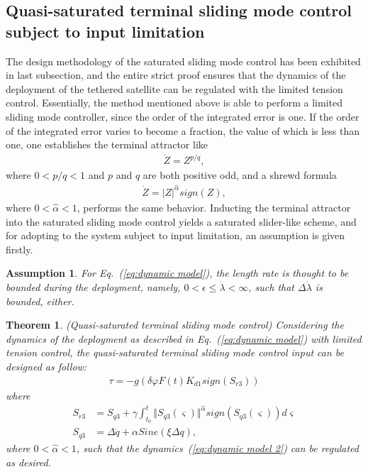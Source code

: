 \documentclass[Journal,letterpaper]{ascelike-new}
\theoremstyle{plain}
\newtheorem{myas}{Assumption}
\newtheorem{mythm}{Theorem}
\theoremstyle{remark}
\begin{document}
\subsection{Quasi-saturated terminal sliding mode control subject to input limitation}
The design methodology of the saturated sliding mode control has been exhibited in last subsection, and the entire strict proof ensures that the dynamics of the deployment of the tethered satellite can be regulated with the limited tension control. Essentially, the method mentioned above is able to perform a limited sliding mode controller, since the order of the integrated error is one. If the order of the integrated error varies to become a fraction, the value of which is less than one, one establishes the terminal attractor like
\begin{align}
\dot Z = Z^{p/q},
\end{align}
where $0<p/q<1$ and $p$ and $q$ are both positive odd, and a shrewd formula
\begin{align}
\dot Z = \vert Z\vert^{\hat\alpha} sign(Z),
\end{align}
where $0<\hat \alpha<1$, performs the same behavior. Inducting the terminal attractor into the saturated sliding mode control yields a saturated slider-like scheme, and for adopting to the system subject to input limitation, an assumption is given firstly.
\begin{myas}\label{as:1}
For Eq.~(\ref{eq:dynamic model}), the length rate is thought to be bounded during the deployment, namely, $0<\epsilon\le\dot \lambda<\infty$, such that $\Delta \dot \lambda$ is bounded, either.
\end{myas}
\begin{mythm}\label{thm:2}(Quasi-saturated terminal sliding mode control)
Considering the dynamics of the deployment as described in Eq.~(\ref{eq:dynamic model}) with limited tension control, the quasi-saturated terminal sliding mode control input can be designed as follow:
\begin{align}
\tau = -g(\delta\varphi F(t) K_{d1}sign(S_{r3}))
\end{align}
where
\begin{align}
S_{r3} &= S_{q3}+\gamma\int^t_{t_0}\Vert S_{q3}(\varsigma)\Vert^{\hat\alpha}  sign(S_{q3}(\varsigma))d\varsigma\label{eq:Sr3}\\
S_{q3} &= \Delta \dot q+\alpha Sine(\xi\Delta q),\label{eq:Sq3}
\end{align}
where $0<\hat\alpha< 1$, such that the dynamics~(\ref{eq:dynamic model 2}) can be regulated as desired.
\end{mythm}
\end{document}
